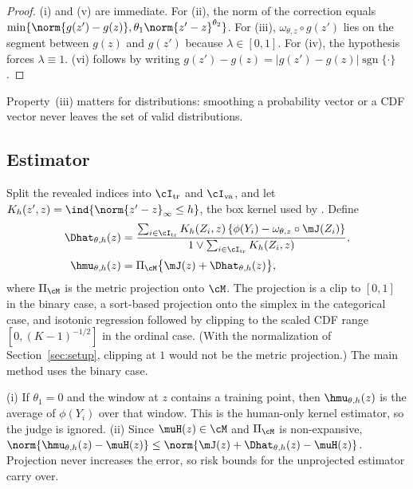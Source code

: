 \begin{proof}
(i) and (v) are immediate. For (ii), the norm of the correction equals
$\min\{\norm{g(z')-g(z)},\theta_1\norm{z'-z}^{\theta_2}\}$. For (iii), $\omega_{\theta,z}\circ g(z')$
lies on the segment between $g(z)$ and $g(z')$ because $\lambda\in[0,1]$. For (iv), the hypothesis
forces $\lambda\equiv1$. (vi) follows by writing $g(z')-g(z)=|g(z')-g(z)|\operatorname{sgn}\{\cdot\}$.
\end{proof}

Property~(iii) matters for distributions: smoothing a probability vector or a CDF vector never
leaves the set of valid distributions.

\subsection{Estimator}

Split the revealed indices into $\cI_{\mathrm{tr}}$ and $\cI_{\mathrm{va}}$, and let
$K_h(z',z)=\ind\{\norm{z'-z}_\infty\le h\}$, the box kernel used by \citet{li2026personalizing}.
Define
\begin{align}
  \Dhat_{\theta,h}(z) &= \frac{\sum_{i\in\cI_{\mathrm{tr}}}K_h(Z_i,z)\,\{\phi(Y_i)-\omega_{\theta,z}\circ\mJ(Z_i)\}}
                             {1\vee\sum_{i\in\cI_{\mathrm{tr}}}K_h(Z_i,z)}, \label{eq:delta-hat}\\[2pt]
  \hmu_{\theta,h}(z)  &= \Pi_{\cM}\bigl\{\mJ(z)+\Dhat_{\theta,h}(z)\bigr\}, \label{eq:mu-hat}
\end{align}
where $\Pi_{\cM}$ is the metric projection onto $\cM$. The projection is a clip to $[0,1]$ in the binary
case, a sort-based projection onto the simplex in the categorical case, and isotonic regression
followed by clipping to the scaled CDF range $[0,(K-1)^{-1/2}]$ in the ordinal case. (With the
normalization of Section~\ref{sec:setup}, clipping at $1$ would not be the metric projection.) The
main method uses the binary case.

\begin{lemma}
\label{lem:estimator}
(i) If $\theta_1=0$ and the window at $z$ contains a training point, then $\hmu_{\theta,h}(z)$ is the
average of $\phi(Y_i)$ over that window. This is the human-only kernel estimator, so the judge is
ignored.
(ii) Since $\muH(z)\in\cM$ and $\Pi_{\cM}$ is non-expansive,
$\norm{\hmu_{\theta,h}(z)-\muH(z)}\le\norm{\mJ(z)+\Dhat_{\theta,h}(z)-\muH(z)}$. Projection never
increases the error, so risk bounds for the unprojected estimator carry over.
\end{lemma}

